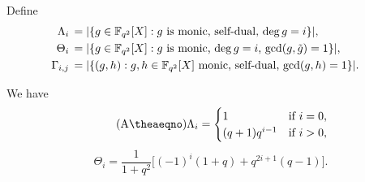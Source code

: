 \documentclass{amsart}
\numberwithin{equation}{section}
\theoremstyle{definition}
\newcommand{\f}{\Bbb F}
\begin{document}
Define
\begin{align*}\label{Gamma-def}
\Lambda_i\,&=|\{g\in\f_{q^2}[X]:\text{$g$ is monic, self-dual, $\deg g=i$}\}|,\cr
\Theta_i\,&=|\{g\in\f_{q^2}[X]:\text{$g$ is monic, $\deg g=i$, $\text{gcd}(g,\tilde g)=1$}\}|,\cr
\Gamma_{i,j}\,&=|\{(g,h):\text{$g,h\in\f_{q^2}[X]$ monic, self-dual, $\text{gcd}(g,h)=1$}\}|.
\end{align*}

\begin{Alem}\label{LA4}
We have
\begin{equation}\tag{A\theaeqno}\label{Lambda}
\Lambda_i=\begin{cases}
1&\text{if}\ i=0,\cr
(q+1)q^{i-1}&\text{if}\ i>0,
\end{cases} 
\end{equation}
\[
\Theta_i=\frac 1{1+q^2}\bigl[(-1)^i(1+q)+q^{2i+1}(q-1)\bigr].
\]
\end{Alem}
\end{document}
